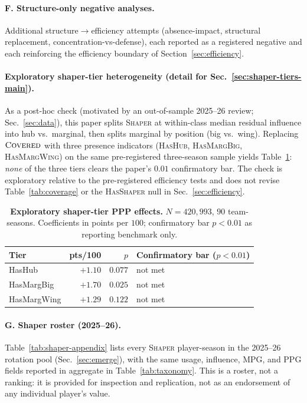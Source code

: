 \documentclass[11pt]{article}
\begin{document}
\paragraph{F. Structure-only negative analyses.} Additional structure$\to$efficiency attempts
(absence-impact, structural replacement, concentration-vs-defense), each reported as a
registered negative and each reinforcing the efficiency boundary of Section~\ref{sec:efficiency}.

\paragraph*{Exploratory shaper-tier heterogeneity (detail for Sec.~\ref{sec:shaper-tiers-main}).}
\label{sec:appendix-shaper-tiers}
As a post-hoc check (motivated by an out-of-sample 2025--26 review; Sec.~\ref{sec:data}),
this paper splits \textsc{Shaper} at within-class median residual influence into hub vs.\
marginal, then splits marginal by position (big vs.\ wing). Replacing $\textsc{Covered}$
with three presence indicators (\textsc{HasHub}, \textsc{HasMargBig}, \textsc{HasMargWing})
on the same pre-registered three-season sample yields Table~\ref{tab:shaper-tiers}:
\emph{none} of the three tiers clears the paper's $0.01$ confirmatory bar. The check is
exploratory relative to the pre-registered efficiency tests and does not revise
Table~\ref{tab:coverage} or the \textsc{HasShaper} null in Sec.~\ref{sec:efficiency}.

\begin{table}[h!]
\centering\small
\caption{\textbf{Exploratory shaper-tier PPP effects.} $N\!=\!420{,}993$, $90$ team-seasons.
Coefficients in points per $100$; confirmatory bar $p<0.01$ as reporting benchmark only.}
\label{tab:shaper-tiers}
\begin{tabular}{lrrl}
\toprule
Tier & pts/100 & $p$ & Confirmatory bar ($p<0.01$) \\
\midrule
HasHub & $+1.10$ & $0.077$ & not met \\
HasMargBig & $+1.70$ & $0.025$ & not met \\
HasMargWing & $+1.29$ & $0.122$ & not met \\
\bottomrule
\end{tabular}
\end{table}

\paragraph{G. Shaper roster (2025--26).} Table~\ref{tab:shaper-appendix} lists every
\textsc{Shaper} player-season in the 2025--26 rotation pool
(Sec.~\ref{sec:emerge}), with the same usage, influence, MPG, and PPG fields reported in
aggregate in Table~\ref{tab:taxonomy}. This is a roster, not a ranking: it is provided for
inspection and replication, not as an endorsement of any individual player's value.
\end{document}

